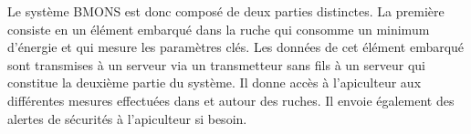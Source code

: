 Le système BMONS est donc composé de deux parties distinctes. La première consiste en un élément embarqué dans la ruche qui consomme un minimum d'énergie et qui mesure les paramètres clés. Les données de cet élément embarqué sont transmises à un serveur via un transmetteur sans fils à un serveur qui constitue la deuxième partie du système. Il donne accès à l'apiculteur aux différentes mesures effectuées dans et autour des ruches. Il envoie également des alertes de sécurités à l'apiculteur si besoin. 